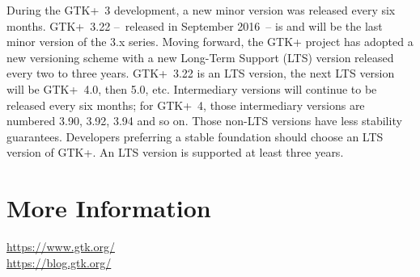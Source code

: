 \documentclass[a4paper,notumble]{leaflet}
\begin{document}
During the GTK+~3 development, a new minor version was released every six months. GTK+~3.22 --~released in September 2016~-- is and will be the last minor version of the 3.x series. Moving forward, the GTK+ project has adopted a new versioning scheme with a new Long-Term Support (LTS) version released every two to three years. GTK+~3.22 is an LTS version, the next LTS version will be GTK+~4.0, then 5.0, etc. Intermediary versions will continue to be released every six months; for GTK+~4, those intermediary versions are numbered 3.90, 3.92, 3.94 and so on. Those non-LTS versions have less stability guarantees. Developers preferring a stable foundation should choose an LTS version of GTK+. An LTS version is supported at least three years.

%
%

\section{More Information}

\url{https://www.gtk.org/}\\
\url{https://blog.gtk.org/}
\end{document}
